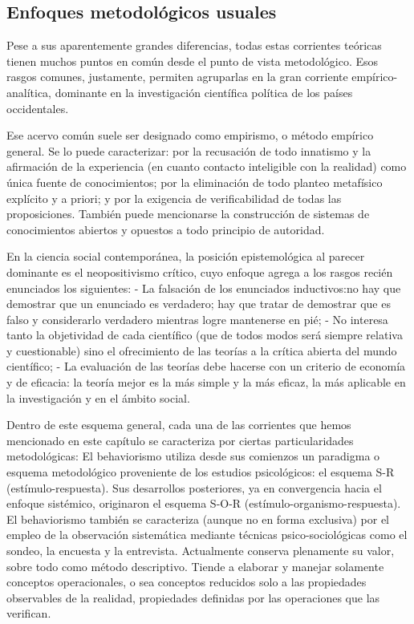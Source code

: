 \documentclass[
]{book}
\begin{document}
\hypertarget{enfoques-metodoluxf3gicos-usuales-1}{%
\subsection*{Enfoques metodológicos usuales}\label{enfoques-metodoluxf3gicos-usuales-1}}

Pese a sus aparentemente grandes diferencias, todas estas corrientes teóricas tienen muchos puntos en común desde el punto de vista metodológico. Esos rasgos comunes, justamente, permiten agruparlas en la gran corriente empírico-analítica, dominante en la investigación científica política de los países occidentales.

Ese acervo común suele ser designado como empirismo, o método empírico general. Se lo puede caracterizar: por la recusación de todo innatismo y la afirmación de la experiencia (en cuanto contacto inteligible con la realidad) como única fuente de conocimientos; por la eliminación de todo planteo metafísico explícito y a priori; y por la exigencia de verificabilidad de todas las proposiciones. También puede mencionarse la construcción de sistemas de conocimientos abiertos y opuestos a todo principio de autoridad.

En la ciencia social contemporánea, la posición epistemológica al parecer dominante es el neopositivismo crítico, cuyo enfoque agrega a los rasgos recién enunciados los siguientes: - La falsación de los enunciados inductivos:no hay que demostrar que un enunciado es verdadero; hay que tratar de demostrar que es falso y considerarlo verdadero mientras logre mantenerse en pié; - No interesa tanto la objetividad de cada científico (que de todos modos será siempre relativa y cuestionable) sino el ofrecimiento de las teorías a la crítica abierta del mundo científico; - La evaluación de las teorías debe hacerse con un criterio de economía y de eficacia: la teoría mejor es la más simple y la más eficaz, la más aplicable en la investigación y en el ámbito social.

Dentro de este esquema general, cada una de las corrientes que hemos mencionado en este capítulo se caracteriza por ciertas particularidades metodológicas: El behaviorismo utiliza desde sus comienzos un paradigma o esquema metodológico proveniente de los estudios psicológicos: el esquema S-R (estímulo-respuesta). Sus desarrollos posteriores, ya en convergencia hacia el enfoque sistémico, originaron el esquema S-O-R (estímulo-organismo-respuesta). El behaviorismo también se caracteriza (aunque no en forma exclusiva) por el empleo de la observación sistemática mediante técnicas psico-sociológicas como el sondeo, la encuesta y la entrevista. Actualmente conserva plenamente su valor, sobre todo como método descriptivo. Tiende a elaborar y manejar solamente conceptos operacionales, o sea conceptos reducidos solo a las propiedades observables de la realidad, propiedades definidas por las operaciones que las verifican.
\end{document}
